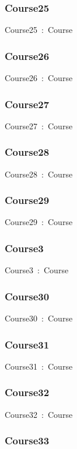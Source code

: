 \documentclass{article}
\begin{document}
\subsubsection*{Course25}

Course25~:~Course

\subsubsection*{Course26}

Course26~:~Course

\subsubsection*{Course27}

Course27~:~Course

\subsubsection*{Course28}

Course28~:~Course

\subsubsection*{Course29}

Course29~:~Course

\subsubsection*{Course3}

Course3~:~Course

\subsubsection*{Course30}

Course30~:~Course

\subsubsection*{Course31}

Course31~:~Course

\subsubsection*{Course32}

Course32~:~Course

\subsubsection*{Course33}
\end{document}
